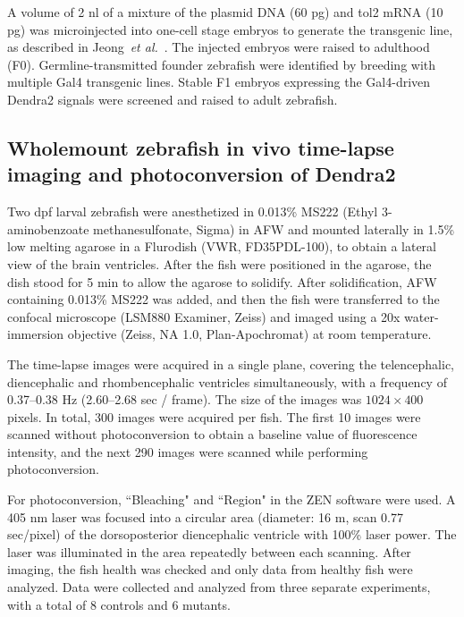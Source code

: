 \documentclass{WileyMSP-template}
\begin{document}
A volume of 2 nl of a mixture of the plasmid DNA (60 pg) and tol2 mRNA (10 pg)
was microinjected into one-cell stage embryos to generate the transgenic line,
as described in Jeong~\emph{et al.}~\cite{Jeong2024TheZebrafish}. The injected
embryos were raised to adulthood (F0).
Germline-transmitted founder zebrafish were identified by breeding with
multiple Gal4 transgenic lines. Stable F1 embryos expressing the Gal4-driven
Dendra2 signals were screened and raised to adult zebrafish.

\subsection{Wholemount zebrafish in vivo time-lapse imaging and photoconversion of Dendra2}
Two dpf larval zebrafish were anesthetized in 0.013\% MS222
(Ethyl 3-aminobenzoate methanesulfonate, Sigma) in AFW and
mounted laterally in 1.5\% low melting agarose in a Flurodish (VWR, FD35PDL-100),
to obtain a lateral view of the brain ventricles. After the
fish were positioned in the agarose, the dish stood for 5 min to allow the agarose to solidify.
After solidification, AFW containing 0.013\% MS222 was added,
and then the fish were transferred to the confocal microscope (LSM880 Examiner, Zeiss)
and imaged using a 20x water-immersion objective (Zeiss, NA 1.0, Plan-Apochromat)
at room temperature.

The time-lapse images were acquired in a single plane, covering the
telencephalic, diencephalic and rhombencephalic ventricles simultaneously,
with a frequency of 0.37--0.38 Hz (2.60--2.68 sec / frame). The size
of the images was $1024\times400$ pixels. In total, 300 images were acquired per fish.
The first 10 images were scanned without photoconversion to obtain a
baseline value of fluorescence intensity, and the next 290 images were
scanned while performing photoconversion. 

For photoconversion, ``Bleaching" and ``Region" in the ZEN software
were used. A 405 nm laser was focused into a circular area (diameter: 16 \textmu m, scan 0.77 \textmu sec/pixel)
of the dorsoposterior diencephalic ventricle with 100\% laser power.
The laser was illuminated in the area repeatedly between each scanning.
After imaging, the fish health was checked and only data from healthy fish were analyzed.
Data were collected and analyzed from three separate experiments,
with a total of 8 controls and 6 mutants.
\end{document}
